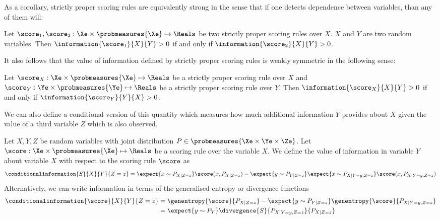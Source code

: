 As a corollary, strictly proper scoring rules are equivalently strong in the sense that if one detects dependence between variables, than any of them will:

\begin{corollary}
	Let $\score_1,\score_2:\Xe\times\probmeasures{\Xe}\mapsto\Reals$ be two strictly proper scoring rules over $X$. $X$ and $Y$ are two random variables. Then $\information{\score_1}{X}{Y} > 0$ if and only if $\information{\score_2}{X}{Y} > 0$.
\end{corollary}

It also follows that the value of information defined by strictly proper scoring rules is weakly symmetric in the following sense:

\begin{corollary}
	Let $\score_X:\Xe\times\probmeasures{\Xe}\mapsto\Reals$ be a strictly proper scoring rule over $X$ and $\score_Y:\Ye\times\probmeasures{\Ye}\mapsto\Reals$ be a strictly proper scoring rule over $Y$.  Then $\information{\score_X}{X}{Y} > 0$ if and only if $\information{\score_Y}{Y}{X} > 0$.
\end{corollary}

We can also define a conditional version of this quantity which measures how much additional information $Y$ provides about $X$ given the value of a third variable $Z$ which is also observed.

\begin{definition}
	\label{def:conditional_value_of_information}
	Let $X,Y,Z$ be random variables with joint distribution $P\in\probmeasures{\Xe\times\Ye\times\Ze}$. Let $\score:\Xe\times\probmeasures{\Xe}\mapsto\Reals$ be a scoring rule over the variable $X$. We define the value of information in variable $Y$ about variable $X$ with respect to the scoring rule $\score$ as
	\begin{equation}
		\conditionalinformation{S}{X}{Y}{Z=z} =  \expect{x\sim P_{X\vert Z=z}}\score(x,P_{X\vert Z=z})- \expect{y\sim P_{Y\vert Z=z}} \expect{x\sim P_{X\vert Y=y, Z=z}}\score(x,P_{X\vert Y=y, Z=z})
	\end{equation}
	Alternatively, we can write information in terms of the generalised entropy or divergence functions
		\begin{align}
			\conditionalinformation{\score}{X}{Y}{Z=z} &=  \genentropy{\score}{P_{X\vert Z=z}} - \expect{y \sim P_{Y \vert Z=z}} \genentropy{\score}{P_{X\vert Y=y, Z=z}}\\
				&= \expect{y\sim P_{Y}}\divergence{S}{P_{X\vert Y=y, Z=z}}{P_{X\vert Z=z}}
		\end{align}
\end{definition}

